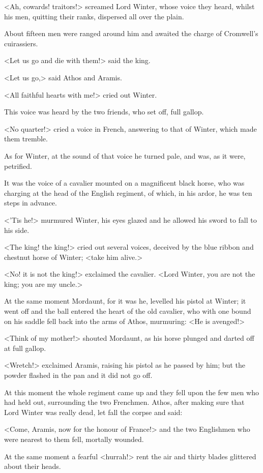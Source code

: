 <Ah, cowards! traitors!> screamed Lord Winter, whose voice they heard, whilst his men, quitting their ranks, dispersed all over the plain.

About fifteen men were ranged around him and awaited the charge of Cromwell's cuirassiers.

<Let us go and die with them!> said the king.

<Let us go,> said Athos and Aramis.

<All faithful hearts with me!> cried out Winter.

This voice was heard by the two friends, who set off, full gallop.

<No quarter!> cried a voice in French, answering to that of Winter, which made them tremble.

As for Winter, at the sound of that voice he turned pale, and was, as it were, petrified.

It was the voice of a cavalier mounted on a magnificent black horse, who was charging at the head of the English regiment, of which, in his ardor, he was ten steps in advance.

<'Tis he!> murmured Winter, his eyes glazed and he allowed his sword to fall to his side.

<The king! the king!> cried out several voices, deceived by the blue ribbon and chestnut horse of Winter; <take him alive.>

<No! it is not the king!> exclaimed the cavalier. <Lord Winter, you are not the king; you are my uncle.>

At the same moment Mordaunt, for it was he, levelled his pistol at Winter; it went off and the ball entered the heart of the old cavalier, who with one bound on his saddle fell back into the arms of Athos, murmuring: <He is avenged!>

<Think of my mother!> shouted Mordaunt, as his horse plunged and darted off at full gallop.

<Wretch!> exclaimed Aramis, raising his pistol as he passed by him; but the powder flashed in the pan and it did not go off.

At this moment the whole regiment came up and they fell upon the few men who had held out, surrounding the two Frenchmen. Athos, after making sure that Lord Winter was really dead, let fall the corpse and said:

<Come, Aramis, now for the honour of France!> and the two Englishmen who were nearest to them fell, mortally wounded.

At the same moment a fearful <hurrah!> rent the air and thirty blades glittered about their heads.

